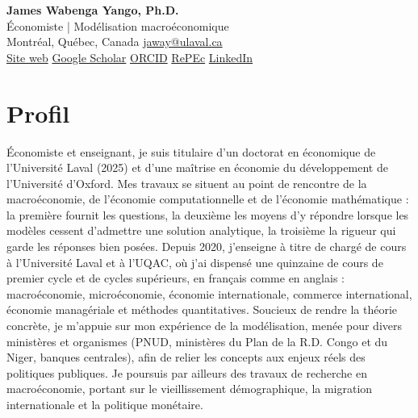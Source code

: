 \documentclass[11pt,letterpaper]{article}
\newcommand{\dotsep}{\;\textcolor{soft}{\textbullet}\;}
\begin{document}
\sloppy
\begin{center}
  {\selectfont\Huge\bfseries\color{accent} James Wabenga Yango, Ph.D.}\\[3pt]
  {\selectfont\large Économiste \textcolor{soft}{|} Modélisation macroéconomique}\\[6pt]
  {\small
    Montréal, Québec, Canada \dotsep \href{mailto:jaway@ulaval.ca}{jaway@ulaval.ca}\\[2pt]
    \href{https://jamwab.github.io}{Site web} \dotsep
    \href{https://scholar.google.com/citations?user=1d2zZn8AAAAJ}{Google Scholar} \dotsep
    \href{https://orcid.org/0000-0002-4675-4583}{ORCID} \dotsep
    \href{https://ideas.repec.org/f/pwa745.html}{RePEc} \dotsep
    \href{https://www.linkedin.com/in/james-wabenga-739a6641/}{LinkedIn}
  }
\end{center}
\vspace{0.2em}
\section{Profil}
Économiste et enseignant, je suis titulaire d'un doctorat en économique de l'Université Laval (2025) et d'une maîtrise en économie du développement de l'Université d'Oxford. Mes travaux se situent au point de rencontre de la macroéconomie, de l'économie computationnelle et de l'économie mathématique : la première fournit les questions, la deuxième les moyens d'y répondre lorsque les modèles cessent d'admettre une solution analytique, la troisième la rigueur qui garde les réponses bien posées. Depuis 2020, j'enseigne à titre de chargé de cours à l'Université Laval et à l'UQAC, où j'ai dispensé une quinzaine de cours de premier cycle et de cycles supérieurs, en français comme en anglais : macroéconomie, microéconomie, économie internationale, commerce international, économie managériale et méthodes quantitatives. Soucieux de rendre la théorie concrète, je m'appuie sur mon expérience de la modélisation, menée pour divers ministères et organismes (PNUD, ministères du Plan de la R.D. Congo et du Niger, banques centrales), afin de relier les concepts aux enjeux réels des politiques publiques. Je poursuis par ailleurs des travaux de recherche en macroéconomie, portant sur le vieillissement démographique, la migration internationale et la politique monétaire.
\end{document}
